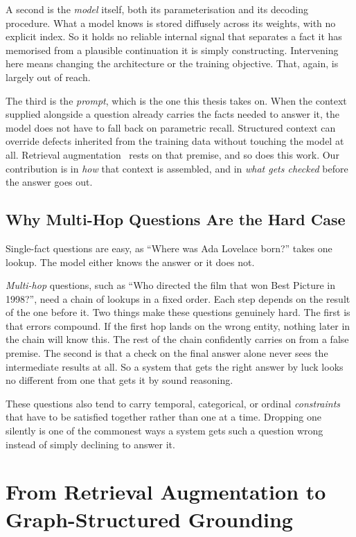 A second is the \emph{model} itself, both its parameterisation and its decoding
procedure. What a model knows is stored diffusely across its weights, with no
explicit index. So it holds no reliable internal signal that separates a fact it
has memorised from a plausible continuation it is simply constructing.
Intervening here means changing the architecture or the training objective.
That, again, is largely out of reach.

The third is the \emph{prompt}, which is the one this thesis takes on. When the
context supplied alongside a question already carries the facts needed to answer
it, the model does not have to fall back on parametric recall. Structured
context can override defects inherited from the training data without touching
the model at all. Retrieval augmentation~\cite{lewis2020retrieval} rests on that
premise, and so does this work. Our contribution is in \emph{how} that context
is assembled, and in \emph{what gets checked} before the answer goes out.

\subsection{Why Multi-Hop Questions Are the Hard Case}

Single-fact questions are easy, as ``Where was Ada Lovelace born?'' takes one
lookup. The model either knows the answer or it does not.

\emph{Multi-hop} questions, such as ``Who directed the
film that won Best Picture in 1998?'', need a chain of lookups in a fixed order.
Each step depends on the result of the one before it. Two things make these
questions genuinely hard. The first is that errors compound. If the first hop
lands on the wrong entity, nothing later in the chain will know this. The rest
of the chain confidently carries on from a false premise. The second is that a
check on the final answer alone never sees the intermediate results at all. So a
system that gets the right answer by luck looks no different from one that gets
it by sound reasoning.

These questions also tend to carry temporal, categorical, or ordinal
\emph{constraints} that have to be satisfied together rather than one at a time.
Dropping one silently is one of the commonest ways a system gets such a question
wrong instead of simply declining to answer it.

\section{From Retrieval Augmentation to Graph-Structured
Grounding}\label{sec:rag-to-graph}

